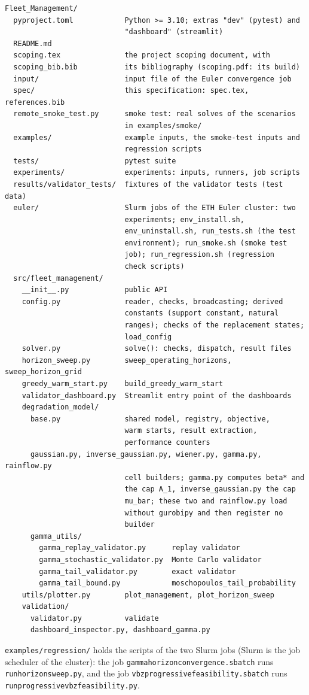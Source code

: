 \documentclass[11pt,a4paper]{article}
\theoremstyle{plain}
\theoremstyle{definition}
\renewcommand{\_}{\textunderscore\allowbreak{}}
\begin{document}
\begin{lstlisting}
Fleet_Management/
  pyproject.toml            Python >= 3.10; extras "dev" (pytest) and
                            "dashboard" (streamlit)
  README.md
  scoping.tex               the project scoping document, with
  scoping_bib.bib           its bibliography (scoping.pdf: its build)
  input/                    input file of the Euler convergence job
  spec/                     this specification: spec.tex, references.bib
  remote_smoke_test.py      smoke test: real solves of the scenarios
                            in examples/smoke/
  examples/                 example inputs, the smoke-test inputs and
                            regression scripts
  tests/                    pytest suite
  experiments/              experiments: inputs, runners, job scripts
  results/validator_tests/  fixtures of the validator tests (test data)
  euler/                    Slurm jobs of the ETH Euler cluster: two
                            experiments; env_install.sh,
                            env_uninstall.sh, run_tests.sh (the test
                            environment); run_smoke.sh (smoke test
                            job); run_regression.sh (regression
                            check scripts)
  src/fleet_management/
    __init__.py             public API
    config.py               reader, checks, broadcasting; derived
                            constants (support constant, natural
                            ranges); checks of the replacement states;
                            load_config
    solver.py               solve(): checks, dispatch, result files
    horizon_sweep.py        sweep_operating_horizons, sweep_horizon_grid
    greedy_warm_start.py    build_greedy_warm_start
    validator_dashboard.py  Streamlit entry point of the dashboards
    degradation_model/
      base.py               shared model, registry, objective,
                            warm starts, result extraction,
                            performance counters
      gaussian.py, inverse_gaussian.py, wiener.py, gamma.py, rainflow.py
                            cell builders; gamma.py computes beta* and
                            the cap A_1, inverse_gaussian.py the cap
                            mu_bar; these two and rainflow.py load
                            without gurobipy and then register no
                            builder
      gamma_utils/
        gamma_replay_validator.py      replay validator
        gamma_stochastic_validator.py  Monte Carlo validator
        gamma_tail_validator.py        exact validator
        gamma_tail_bound.py            moschopoulos_tail_probability
    utils/plotter.py        plot_management, plot_horizon_sweep
    validation/
      validator.py          validate
      dashboard_inspector.py, dashboard_gamma.py
\end{lstlisting}
\texttt{examples/regression/} holds the scripts of the two Slurm jobs (Slurm is the job scheduler of the cluster): the job \texttt{gamma\_horizon\_convergence.sbatch} runs \texttt{run\_horizon\_sweep.py}, and the job \texttt{vbz\_progressive\_feasibility.sbatch} runs \texttt{run\_progressive\_vbz\_feasibility.py}.
\end{document}
